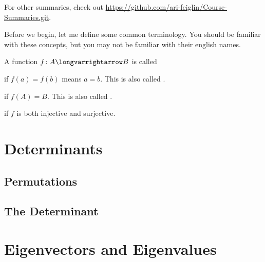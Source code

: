 \documentclass[10pt]{article}
\let\longto=\longvarrightarrow
\let\longto=\longvarrightarrow
\begin{document}

\bigskip

For other summaries, check out \textcolor{blue}{\url{https://github.com/ari-feiglin/Course-Summaries.git}}.

\tableofcontents

\newpage

Before we begin, let me define some common terminology.
You should be familiar with these concepts, but you may not be familiar with their english names.

\begin{defn*}

    A function $f\colon A\longto B$ is called
    \blist
        \item {} if $f(a)=f(b)$ means $a=b$.
        This is also called .
        \item {} if $f(A)=B$.
        This is also called .
        \item {} if $f$ is both injective and surjective.
    \elist

\end{defn*}

\section{Determinants}

\subsection{Permutations}



\subsection{The Determinant}



\newpage
\section{Eigenvectors and Eigenvalues}


\end{document}
